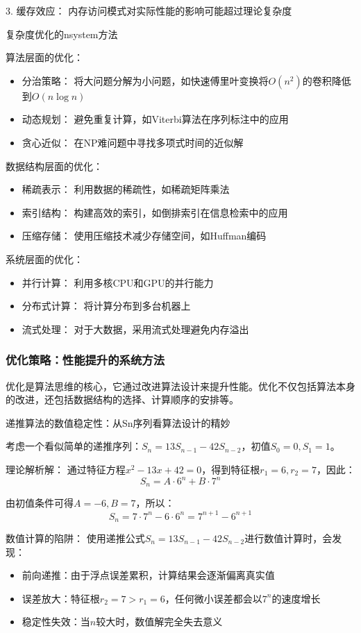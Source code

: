 3. 缓存效应： 内存访问模式对实际性能的影响可能超过理论复杂度

复杂度优化的nsystem方法

算法层面的优化：
\begin{itemize}
\item 分治策略： 将大问题分解为小问题，如快速傅里叶变换将$O(n^2)$的卷积降低到$O(n \log n)$
\item 动态规划： 避免重复计算，如Viterbi算法在序列标注中的应用
\item 贪心近似： 在NP难问题中寻找多项式时间的近似解
\end{itemize}

数据结构层面的优化：
\begin{itemize}
\item 稀疏表示： 利用数据的稀疏性，如稀疏矩阵乘法
\item 索引结构： 构建高效的索引，如倒排索引在信息检索中的应用
\item 压缩存储： 使用压缩技术减少存储空间，如Huffman编码
\end{itemize}

系统层面的优化：
\begin{itemize}
\item 并行计算： 利用多核CPU和GPU的并行能力
\item 分布式计算： 将计算分布到多台机器上
\item 流式处理： 对于大数据，采用流式处理避免内存溢出
\end{itemize}

\subsubsection{优化策略：性能提升的系统方法}

优化是算法思维的核心，它通过改进算法设计来提升性能。优化不仅包括算法本身的改进，还包括数据结构的选择、计算顺序的安排等。

递推算法的数值稳定性：从Sn序列看算法设计的精妙

考虑一个看似简单的递推序列：$S_n = 13S_{n-1} - 42S_{n-2}$，初值$S_0 = 0, S_1 = 1$。

理论解析解：
通过特征方程$x^2 - 13x + 42 = 0$，得到特征根$r_1 = 6, r_2 = 7$，因此：
$$S_n = A \cdot 6^n + B \cdot 7^n$$

由初值条件可得$A = -6, B = 7$，所以：
$$S_n = 7 \cdot 7^n - 6 \cdot 6^n = 7^{n+1} - 6^{n+1}$$

数值计算的陷阱：
使用递推公式$S_n = 13S_{n-1} - 42S_{n-2}$进行数值计算时，会发现：

\begin{itemize}
\item 前向递推：由于浮点误差累积，计算结果会逐渐偏离真实值
\item 误差放大：特征根$r_2 = 7 > r_1 = 6$，任何微小误差都会以$7^n$的速度增长
\item 稳定性失效：当$n$较大时，数值解完全失去意义
\end{itemize}

